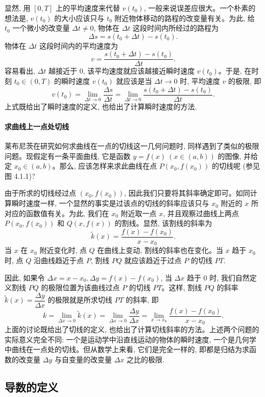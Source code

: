 显然, 用 $[0,T]$ 上的平均速度来代替 $v(t_0)$, 一般来说误差应很大。一个朴素的想法是, $v(t_0)$ 的大小应该只与 $t_0$ 附近物体移动的路程的改变量有关。为此, 给 $t_0$ 一个微小的改变量 $\Delta t\ne0$, 物体在 $\Delta t$ 这段时间内所经过的路程为
\[
  \Delta s=s(t_0+\Delta t)-s(t_0).
\]
物体在 $\Delta t$ 这段时间内的平均速度为
\[
  v=\frac{s(t_0+\Delta t)-s(t_0)}{\Delta t}.
\]
容易看出, $\Delta t$ 越接近于 $0$, 该平均速度就应该越接近瞬时速度 $v(t_0)$。于是, 在时刻 $t_0\in(0,T)$ 的瞬时速度 $v(t_0)$ 就应该是当 $\Delta t\to0$ 时, 平均速度 $v$ 的极限, 即
\[
  v(t_0)
  =
  \lim_{\Delta t\to0}\frac{\Delta s}{\Delta t}
  =
  \lim_{\Delta t\to0}
  \frac{s(t_0+\Delta t)-s(t_0)}{\Delta t}.
\]
上式既给出了瞬时速度的定义, 也给出了计算瞬时速度的方法.

\paragraph*{求曲线上一点处切线}


莱布尼茨在研究如何求曲线在一点的切线这一几何问题时, 同样遇到了类似的极限问题。现假定有一条平面曲线, 它是函数 $y=f(x)\ (x\in(a,b))$ 的图像, 并给定 $x_0\in(a,b)$。那么, 应该怎样来求此曲线在点 $P(x_0,f(x_0))$ 的切线呢 (参见图 4.1.1)?

由于所求的切线经过点 $(x_0,f(x_0))$, 因此我们只要将其斜率确定即可。如同计算瞬时速度一样, 一个显然的事实是过该点的切线的斜率应该只与 $x_0$ 附近的 $x$ 所对应的函数值有关。为此, 我们在 $x_0$ 附近取一点 $x$, 并且观察过曲线上两点 $P(x_0,f(x_0))$ 和 $Q(x,f(x))$ 的割线。显然, 该割线的斜率为
\[
  \tilde{k}(x)=\frac{f(x)-f(x_0)}{x-x_0}.
\]
当 $x$ 在 $x_0$ 附近变化时, 点 $Q$ 在曲线上变动, 割线的斜率也在变化。当 $x$ 趋于 $x_0$ 时, 点 $Q$ 沿曲线趋近于点 $P$, 割线 $PQ$ 就应该趋近于过点 $P$ 的切线 $PT$.

因此, 如果令 $\Delta x=x-x_0,\Delta y=f(x)-f(x_0)$, 当 $\Delta x$ 趋于 $0$ 时, 我们自然定义割线 $PQ$ 的极限位置为该曲线过点 $P$ 的切线 $PT$。这样, 割线 $PQ$ 的斜率 $\tilde{k}(x)=\dfrac{\Delta y}{\Delta x}$ 的极限就是所求切线 $PT$ 的斜率, 即
\[
  k=
  \lim_{\Delta x\to0}\tilde{k}(x)
  =
  \lim_{\Delta x\to0}\frac{\Delta y}{\Delta x}
  =
  \lim_{x\to x_0}\frac{f(x)-f(x_0)}{x-x_0}.
\]
上面的讨论既给出了切线的定义, 也给出了计算切线斜率的方法。上述两个问题的实际意义完全不同: 一个是运动学中沿直线运动的物体的瞬时速度, 一个是几何学中曲线在一点处的切线。但从数学上来看, 它们是完全一样的, 即都是归结为求函数的改变量 $\Delta y$ 与自变量的改变量 $\Delta x$ 之比的极限.

\subsection{导数的定义}
\label{subsec:ma-4-1-2}

